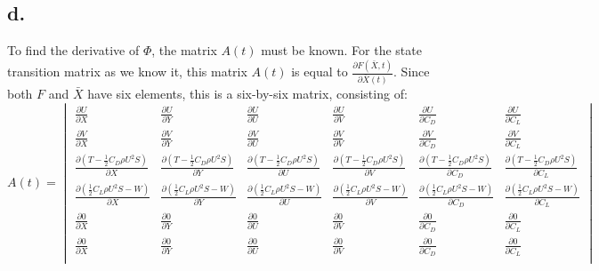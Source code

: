 \documentclass[a4paper,10pt,titlepage]{article}
\begin{document}
\subsection*{d.}
To find the derivative of $\Phi$, the matrix $A(t)$ must be known. For the state transition matrix as we know it, this matrix $A(t)$ is equal to $\frac{\partial F(\bar{X},t)}{\partial \bar{X}(t)}$. Since both $F$ and $\bar{X}$ have six elements, this is a six-by-six matrix, consisting of:
\begin{equation*}
    A(t) = \begin{vmatrix}
    \frac{\partial U }{\partial X} & \frac{\partial U }{\partial Y} & \frac{\partial U }{\partial U} & \frac{\partial U }{\partial V} & \frac{\partial U }{\partial C_D} & \frac{\partial U }{\partial C_L}  \\
    \frac{\partial V }{\partial X} & \frac{\partial V }{\partial Y} & \frac{\partial V }{\partial U} & \frac{\partial V }{\partial V} & \frac{\partial V }{\partial C_D} & \frac{\partial V }{\partial C_L}  \\
    \frac{\partial (T - \frac{1}{2} C_D \rho U^2 S) }{\partial X} & \frac{\partial (T - \frac{1}{2} C_D \rho U^2 S ) }{\partial Y} & \frac{\partial (T - \frac{1}{2} C_D \rho U^2 S ) }{\partial U} & \frac{\partial (T - \frac{1}{2} C_D \rho U^2 S ) }{\partial V} & \frac{\partial (T - \frac{1}{2} C_D \rho U^2 S ) }{\partial C_D} & \frac{\partial (T - \frac{1}{2} C_D \rho U^2 S ) }{\partial C_L}  \\
    \frac{\partial ( \frac{1}{2} C_L \rho U^2 S - W) }{\partial X} & \frac{\partial ( \frac{1}{2} C_L \rho U^2 S - W ) }{\partial Y} & \frac{\partial ( \frac{1}{2} C_L \rho U^2 S - W ) }{\partial U} & \frac{\partial ( \frac{1}{2} C_L \rho U^2 S - W ) }{\partial V} & \frac{\partial ( \frac{1}{2} C_L \rho U^2 S - W ) }{\partial C_D} & \frac{\partial ( \frac{1}{2} C_L \rho U^2 S - W ) }{\partial C_L}  \\
    \frac{\partial 0 }{\partial X} & \frac{\partial 0 }{\partial Y} & \frac{\partial 0 }{\partial U} & \frac{\partial 0 }{\partial V} & \frac{\partial 0 }{\partial C_D} & \frac{\partial 0 }{\partial C_L}  \\
    \frac{\partial 0 }{\partial X} & \frac{\partial 0 }{\partial Y} & \frac{\partial 0 }{\partial U} & \frac{\partial 0 }{\partial V} & \frac{\partial 0 }{\partial C_D} & \frac{\partial 0 }{\partial C_L}  \\
\end{vmatrix}
\end{equation*}
\end{document}

